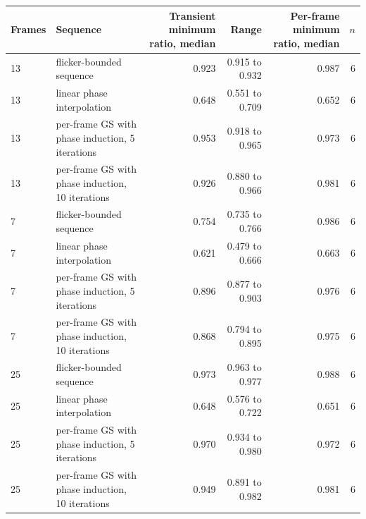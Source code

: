 \begin{tabular}{@{}l l r r r r@{}}
\toprule
Frames & Sequence & Transient minimum ratio, median & Range & Per-frame minimum ratio, median & $n$ \\
\midrule
13 & flicker-bounded sequence & 0.923 & 0.915 to 0.932 & 0.987 & 6 \\
13 & linear phase interpolation & 0.648 & 0.551 to 0.709 & 0.652 & 6 \\
13 & per-frame GS with phase induction, 5 iterations & 0.953 & 0.918 to 0.965 & 0.973 & 6 \\
13 & per-frame GS with phase induction, 10 iterations & 0.926 & 0.880 to 0.966 & 0.981 & 6 \\
7 & flicker-bounded sequence & 0.754 & 0.735 to 0.766 & 0.986 & 6 \\
7 & linear phase interpolation & 0.621 & 0.479 to 0.666 & 0.663 & 6 \\
7 & per-frame GS with phase induction, 5 iterations & 0.896 & 0.877 to 0.903 & 0.976 & 6 \\
7 & per-frame GS with phase induction, 10 iterations & 0.868 & 0.794 to 0.895 & 0.975 & 6 \\
25 & flicker-bounded sequence & 0.973 & 0.963 to 0.977 & 0.988 & 6 \\
25 & linear phase interpolation & 0.648 & 0.576 to 0.722 & 0.651 & 6 \\
25 & per-frame GS with phase induction, 5 iterations & 0.970 & 0.934 to 0.980 & 0.972 & 6 \\
25 & per-frame GS with phase induction, 10 iterations & 0.949 & 0.891 to 0.982 & 0.981 & 6 \\
\bottomrule
\end{tabular}
